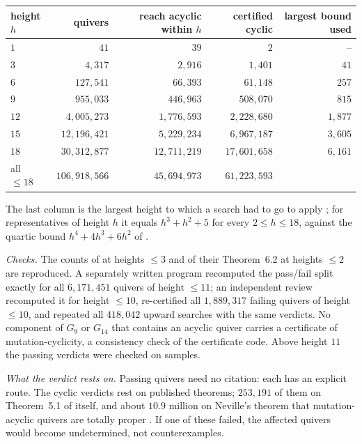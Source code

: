 \documentclass[11pt]{amsart}
\theoremstyle{definition}
\theoremstyle{remark}
\begin{document}
\begin{center}\small
\begin{tabular}{lrrrr}
\toprule
height $h$ & quivers & reach acyclic within $h$ & certified cyclic & largest bound used\\
\midrule
$1$ & $41$ & $39$ & $2$ & --\\
$3$ & $4{,}317$ & $2{,}916$ & $1{,}401$ & $41$\\
$6$ & $127{,}541$ & $66{,}393$ & $61{,}148$ & $257$\\
$9$ & $955{,}033$ & $446{,}963$ & $508{,}070$ & $815$\\
$12$ & $4{,}005{,}273$ & $1{,}776{,}593$ & $2{,}228{,}680$ & $1{,}877$\\
$15$ & $12{,}196{,}421$ & $5{,}229{,}234$ & $6{,}967{,}187$ & $3{,}605$\\
$18$ & $30{,}312{,}877$ & $12{,}711{,}219$ & $17{,}601{,}658$ & $6{,}161$\\
all $\le18$ & $106{,}918{,}566$ & $45{,}694{,}973$ & $61{,}223{,}593$ & \\
\bottomrule
\end{tabular}
\end{center}
The last column is the largest height to which a search had to go to apply \cite[Cor.~5.2]{AHJL}; for representatives of height $h$ it equals $h^3+h^2+5$ for every $2\le h\le18$, against the quartic bound $h^4+4h^3+6h^2$ of \cite[Cor.~5.3]{AHJL}.

\emph{Checks.} The counts of \cite{AHJL} at heights $\le3$ and of their Theorem~6.2 at heights $\le2$ are reproduced. A separately written program recomputed the pass/fail split exactly for all $6{,}171{,}451$ quivers of height $\le11$; an independent review recomputed it for height $\le10$, re-certified all $1{,}889{,}317$ failing quivers of height $\le10$, and repeated all $418{,}042$ upward searches with the same verdicts. No component of $G_9$ or $G_{14}$ that contains an acyclic quiver carries a certificate of mutation-cyclicity, a consistency check of the certificate code. Above height $11$ the passing verdicts were checked on samples.

\emph{What the verdict rests on.} Passing quivers need no citation: each has an explicit route. The cyclic verdicts rest on published theorems; $253{,}191$ of them on Theorem~5.1 of \cite{AHJL} itself, and about $10.9$ million on Neville's theorem that mutation-acyclic quivers are totally proper \cite{Nev}. If one of these failed, the affected quivers would become undetermined, not counterexamples.
\end{document}
